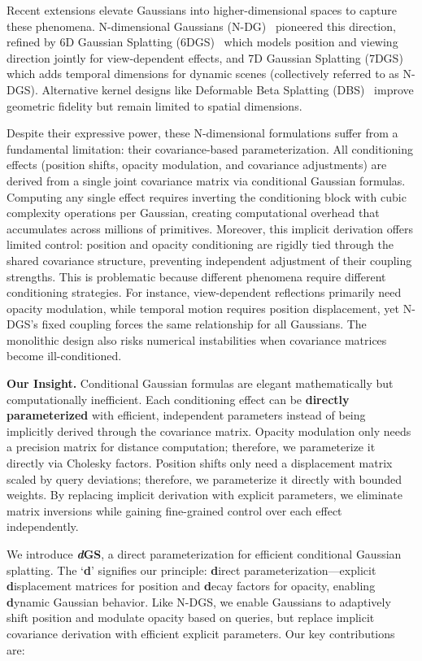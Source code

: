 \documentclass{article}
\newcommand{\modelname}{\textit{d}GS}
\theoremstyle{plain}
\theoremstyle{definition}
\theoremstyle{remark}
\begin{document}
Recent extensions elevate Gaussians into higher-dimensional spaces to capture these phenomena. N-dimensional Gaussians (N-DG)~\citep{diolatzis2024n} pioneered this direction, refined by 6D Gaussian Splatting (6DGS)~\citep{gao20246dgs} which models position and viewing direction jointly for view-dependent effects, and 7D Gaussian Splatting (7DGS)~\citep{gao20257dgs} which adds temporal dimensions for dynamic scenes (collectively referred to as N-DGS). Alternative kernel designs like Deformable Beta Splatting (DBS)~\citep{liu2025deformable} improve geometric fidelity but remain limited to spatial dimensions.


Despite their expressive power, these N-dimensional formulations suffer from a fundamental limitation: their covariance-based parameterization. All conditioning effects (position shifts, opacity modulation, and covariance adjustments) are derived from a single joint covariance matrix via conditional Gaussian formulas. Computing any single effect requires inverting the conditioning block with cubic complexity operations per Gaussian, creating computational overhead that accumulates across millions of primitives. Moreover, this implicit derivation offers limited control: position and opacity conditioning are rigidly tied through the shared covariance structure, preventing independent adjustment of their coupling strengths. This is problematic because different phenomena require different conditioning strategies. For instance, view-dependent reflections primarily need opacity modulation, while temporal motion requires position displacement, yet N-DGS's fixed coupling forces the same relationship for all Gaussians. The monolithic design also risks numerical instabilities when covariance matrices become ill-conditioned.

\textbf{Our Insight.} Conditional Gaussian formulas are elegant mathematically but computationally inefficient. Each conditioning effect can be \textbf{directly parameterized} with efficient, independent parameters instead of being implicitly derived through the covariance matrix. Opacity modulation only needs a precision matrix for distance computation; therefore, we parameterize it directly via Cholesky factors. Position shifts only need a displacement matrix scaled by query deviations; therefore, we parameterize it directly with bounded weights. By replacing implicit derivation with explicit parameters, we eliminate matrix inversions while gaining fine-grained control over each effect independently.

We introduce \textbf{\modelname{}}, a direct parameterization for efficient conditional Gaussian splatting. The `\textbf{d}' signifies our principle: \textbf{d}irect parameterization---explicit \textbf{d}isplacement matrices for position and \textbf{d}ecay factors for opacity, enabling \textbf{d}ynamic Gaussian behavior. Like N-DGS, we enable Gaussians to adaptively shift position and modulate opacity based on queries, but replace implicit covariance derivation with efficient explicit parameters. Our key contributions are:
\end{document}
